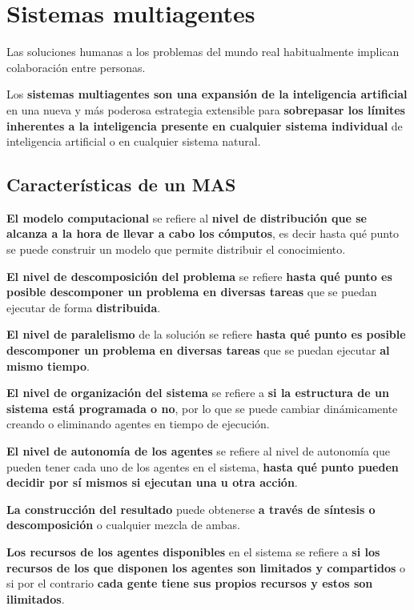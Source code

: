 \documentclass[12pt, twoside, openright]{report} %
\begin{document}
\section{Sistemas multiagentes}
Las soluciones humanas a los problemas del mundo real habitualmente implican colaboración entre personas. 

Los \textbf{sistemas multiagentes son una expansión de la inteligencia artificial} en una nueva y más poderosa estrategia extensible para \textbf{sobrepasar los límites inherentes a la inteligencia presente en cualquier sistema individual} de inteligencia artificial o en cualquier sistema natural. 

\subsection{Características de un MAS}
\textbf{El modelo computacional} se refiere al \textbf{nivel de distribución que se alcanza a la hora de llevar a cabo los cómputos}, es decir hasta qué punto se puede construir un modelo que permite distribuir el conocimiento. 

\textbf{El nivel de descomposición del problema} se refiere \textbf{hasta qué punto es posible descomponer un problema en diversas tareas} que se puedan ejecutar de forma \textbf{distribuida}.

\textbf{El nivel de paralelismo} de la solución se refiere \textbf{hasta qué punto es posible descomponer un problema en diversas tareas} que se puedan ejecutar \textbf{al mismo tiempo}.

\textbf{El nivel de organización del sistema} se refiere a \textbf{si la estructura de un sistema está programada o no}, por lo que se puede cambiar dinámicamente creando o eliminando agentes en tiempo de ejecución. 
\pagebreak

\textbf{El nivel de autonomía de los agentes} se refiere al nivel de autonomía que pueden tener cada uno de los agentes en el sistema, \textbf{hasta qué punto pueden decidir por sí mismos si ejecutan una u otra acción}. 

\textbf{La construcción del resultado} puede obtenerse \textbf{a través de síntesis o descomposición} o cualquier mezcla de ambas.

\textbf{Los recursos de los agentes disponibles} en el sistema se refiere a \textbf{si los recursos de los que disponen los agentes son limitados y compartidos} o si por el contrario \textbf{cada gente tiene sus propios recursos y estos son ilimitados}. 
\end{document}
